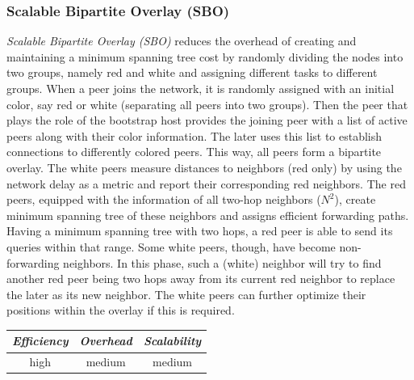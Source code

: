 \subsubsection{Scalable Bipartite Overlay (SBO)}
\emph{Scalable Bipartite Overlay (SBO)}
\cite{LXN2004,LXN2007} reduces the overhead of creating
and maintaining a minimum spanning tree cost by randomly dividing the nodes into
two groups, namely red and white and assigning different tasks to different
groups. When a peer joins the network, it is randomly assigned with an initial
color, say red or white (separating all peers into two groups). Then the peer
that plays the role of the bootstrap host provides the joining peer with a list
of active peers along with their color information. The later uses this list to
establish connections to differently colored peers. This way, all peers form a
bipartite overlay. The white peers measure distances to neighbors (red only) by
using the network delay as a metric and report their corresponding red
neighbors. The red peers, equipped with the information of all two-hop
neighbors ($N^2$), create minimum spanning tree of these neighbors and
assigns efficient forwarding paths. Having a minimum spanning tree with two
hops, a red peer is able to send its queries within that range. Some white
peers, though, have become non-forwarding neighbors. In this phase, such a
(white) neighbor will try to find another red peer being two hops away from its
current red neighbor to replace the later as its new neighbor. The white peers
can further optimize their positions within the overlay if this is required.

%
%
%

\begin{center}
\begin{tabular}{ccc}
\emph{Efficiency} & \emph{Overhead} & \emph{Scalability} \\
\hline
high &
medium &
%
medium
\end{tabular}
\end{center}

